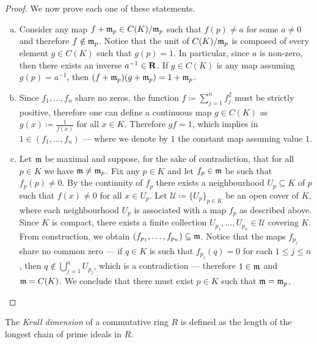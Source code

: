 \begin{proof}
We now prove each one of these statements.
\begin{enumerate}[(a)]\setlength\itemsep{0em}
\item Consider any map \(f + \mathfrak{m}_p \in C(K)/\mathfrak{m}_p\) such that
  \(f(p) \neq a\) for some \(a \neq 0\) and therefore \(f \notin
  \mathfrak{m}_p\). Notice that the unit of \(C(K)/\mathfrak{m}_p\) is composed of
  every element \(g \in C(K)\) such that \(g(p) = 1\). In particular, since
  \(a\) is non-zero, then there exists an inverse \(a^{-1} \in \mathbf{R}\). If
  \(g \in C(K)\) is any map assuming \(g(p) = a^{-1}\), then
  \((f + \mathfrak{m}_p) (g + \mathfrak{m}_p) = 1 + \mathfrak{m}_p\).

\item Since \(f_1, \dots, f_n\) share no zeros, the function
  \(f \coloneq \sum_{j=1}^n f_j^2\) must be strictly positive, therefore one can
  define a continuous map \(g \in C(K)\) as \(g(x) \coloneq \frac{1}{f(x)}\) for
  all \(x \in K\). Therefore \(g f = 1\), which implies in
  \(1 \in (f_1, \dots, f_n)\) --- where we denote by \(1\) the constant map
  assuming value \(1\).

\item Let \(\mathfrak{m}\) be maximal and suppose, for the sake of contradiction,
  that for all \(p \in K\) we have \(\mathfrak{m} \neq \mathfrak{m}_p\). Fix any
  \(p \in K\) and let \(f_p \in \mathfrak{m}\) be such that \(f_p(p) \neq 0\). By
  the continuity of \(f_p\) there exists a neighbourhood \(U_p \subseteq K\) of
  \(p\) such that \(f(x) \neq 0\) for all \(x \in U_p\). Let
  \(\mathcal{U} \coloneq \{ U_{p}\}_{p \in K}\) be an open cover of \(K\), where
  each neighbourhood \(U_p\) is associated with a map \(f_p\) as described
  above. Since \(K\) is compact, there exists a finite collection
  \(U_{p_1}, \dots, U_{p_n} \in \mathcal{U}\) covering \(K\). From construction,
  we obtain \((f_{p_1}, \dots, f_{p_n}) \subseteq \mathfrak{m}\). Notice that the
  maps \(f_{p_j}\) share no common zero --- if \(q \in K\) is such that
  \(f_{p_j}(q) = 0\) for each \(1 \leq j \leq n\), then
  \(q \notin \bigcup_{j=1}^n U_{p_j}\), which is a contradiction --- therefore
  \(1 \in \mathfrak{m}\) and \(\mathfrak{m} = C(K)\). We conclude that there must
  exist \(p \in K\) such that \(\mathfrak{m} = \mathfrak{m}_p\).
\end{enumerate}
\end{proof}

\begin{definition}
\label{def:krull-dimension}
The \emph{Krull dimension} of a commutative ring \(R\) is defined as the length
of the longest chain of prime ideals in \(R\).
\end{definition}

